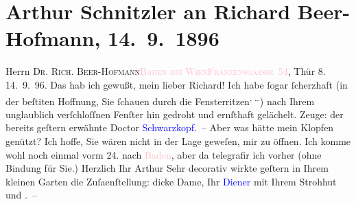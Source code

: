 

               \section[Arthur Schnitzler an Richard Beer-Hofmann, 14. 9. 1896]{ Arthur Schnitzler an Richard Beer-Hofmann, 14. 9. 1896}\nopagebreak{}\rehead{ }\normalsize\beginnumbering{} \toendnotes[C]{\smallbreak\pagebreak[2]} 
\toendnotes[C]{\smallbreak}\pstart{}{\pb}Herrn \textsc{Dr. Rich.
                     Beer-Hofmann}\pend{}\pstart{}\textsc{\textcolor{pink}{Baden bei Wien}{}\ledrightnote{\textcolor{pink}{Baden bei Wien}}}\pend{}\pstart{}\textsc{\textcolor{pink}{Franzensgassse 54}{}\ledrightnote{\textcolor{pink}{Kaiser-Franz-Ring}}}, Thür 8.\pend{}{\bigskip}\pstart
           \raggedleft{}{\pb}14. 9. 96.\pend
           \pstart
           Das hab ich gewußt, mein lieber Richard! Ich habe ſogar ſcherzhaft
                  \introOben{}(\introOben{}in der beſti{\geminationm}ten Hoffnung,
               Sie ſchauen durch die Fensterritzen\substVorne{}\textsuperscript{, {\dots}}\substDazwischen{})\substHinten{} nach Ihrem unglaublich verſchloſſnen Fenſter hin gedroht und ernſthaft
               gelächelt. Zeuge: {\pb}der bereits geſtern erwähnte Doctor
                  \textcolor{blue}{Schwarzkopf}{}\ledrightnote{\textcolor{blue}{Gustav Schwarzkopf}}. – Aber was hätte mein Klopfen
               genützt? Ich hoffe, Sie wären nicht in der Lage geweſen, mir zu öffnen.\pend
           \pstart
           Ich komme wohl noch einmal vorm 24. nach \textcolor{pink}{Baden}{}\ledrightnote{\textcolor{pink}{Baden bei Wien}}, {\pb}aber da telegrafir ich vorher (ohne
               Bindung für Sie.)\pend
           \pstart Herzlich Ihr \spacefill\mbox{Arthur}\pend{}\pstart
           \noindent{}Sehr decorativ wirkte geſtern in Ihrem kleinen Garten die Zuſa{\geminationm}enſtellung: dicke Dame, Ihr \textcolor{blue}{Diener}{} mit Ihrem Strohhut und \label{K_L00590_1v}\label{K_L00590_1h}. – \pend
           \endnumbering{}  
      